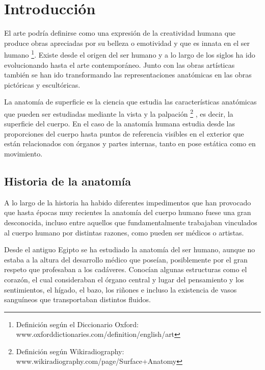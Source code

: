 \section{Introducción} %
El arte podría definirse como una expresión de la creatividad humana que produce obras apreciadas por su belleza o emotividad y que es innata en el ser humano \footnote{Definición según el Diccionario Oxford: www.oxforddictionaries.com/definition/english/art}. Existe desde el origen del ser humano y  %
a lo largo de los siglos ha ido evolucionando hasta el arte contemporáneo. Junto con las obras artísticas también se han ido transformando las representaciones anatómicas en las obras pictóricas y escultóricas.

La anatomía de superficie es la ciencia que estudia las características anatómicas que pueden ser estudiadas mediante la vista y la palpación \footnote{Definición según Wikiradiography: www.wikiradiography.com/page/Surface+Anatomy}%
, es decir, la superficie del cuerpo. En el caso de la anatomía humana estudia desde las proporciones del cuerpo hasta puntos de referencia visibles en el exterior que están relacionados con órganos y partes internas, tanto en pose estática como en movimiento. %

\subsection{Historia de la anatomía}
A lo largo de la historia ha habido diferentes impedimentos que han provocado que hasta épocas muy recientes la anatomía del cuerpo humano fuese una gran desconocida, incluso entre aquellos que fundamentalmente trabajaban vinculados al cuerpo humano por distintas razones, como pueden ser médicos o artistas.

Desde el antiguo Egipto se ha estudiado la anatomía del ser humano, aunque no estaba a la altura del desarrollo médico que poseían, posiblemente por el gran respeto que profesaban a los cadáveres. Conocían algunas estructuras como el corazón, el cual consideraban el órgano central y lugar del pensamiento y los sentimientos, el hígado, el bazo, los riñones e incluso la existencia de vasos sanguíneos que transportaban distintos fluidos.

